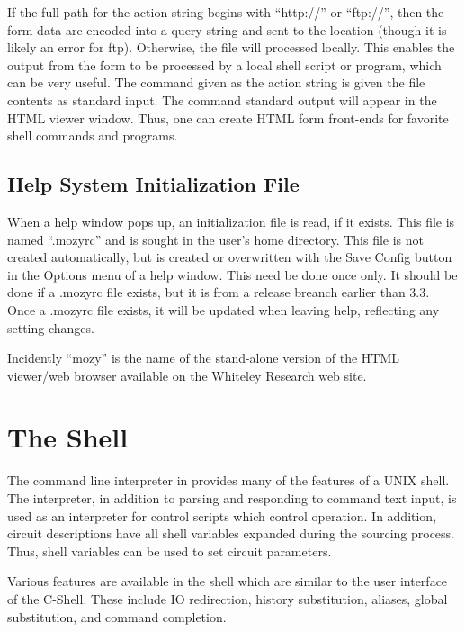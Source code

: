 If the full path for the action string begins with ``{\vt http://}''
or ``{\vt ftp://}'', then the form data are encoded into a query
string and sent to the location (though it is likely an error for
ftp).  Otherwise, the file will processed locally.  This enables the
output from the form to be processed by a local shell script or
program, which can be very useful.  The command given as the action
string is given the file contents as standard input.  The command
standard output will appear in the HTML viewer window.  Thus, one can
create HTML form front-ends for favorite shell commands and programs.

\subsection{Help System Initialization File}

When a help window pops up, an initialization file is read, if it
exists.  This file is named ``{\vt .mozyrc}'' and is sought in the
user's home directory.  This file is not created automatically, but is
created or overwritten with the {\cb Save Config} button in the {\cb
Options} menu of a help window.  This need be done once only.  It
should be done if a {\vt .mozyrc} file exists, but it is from a
release breanch earlier than 3.3.  Once a {\vt .mozyrc} file exists,
it will be updated when leaving help, reflecting any setting changes.

Incidently ``mozy'' is the name of the stand-alone version of the HTML
viewer/web browser available on the Whiteley Research web site.


\section{The {\WRspice} Shell}
\label{shell}


The command line interpreter in {\WRspice} provides many of the
features of a UNIX shell.  The interpreter, in addition to parsing and
responding to command text input, is used as an interpreter for
control scripts which control {\WRspice} operation.  In addition,
circuit descriptions have all shell variables expanded during the
sourcing process.  Thus, shell variables can be used to set circuit
parameters.

Various features are available in the {\WRspice} shell which are
similar to the user interface of the C-Shell.  These include IO
redirection, history substitution, aliases, global substitution, and
command completion.

